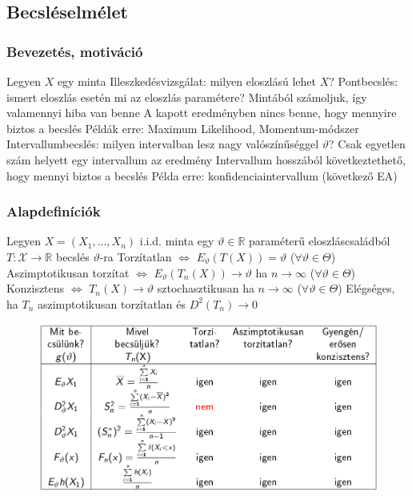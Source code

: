 \documentclass[12pt,a4paper]{article}
\begin{document}
\subsection{Becsléselmélet}

\subsubsection{Bevezetés, motiváció}

\begin{outline}
	\1 Legyen $X$ egy minta
	\1 Illeszkedésvizsgálat: milyen eloszlású lehet $X$?
	\1 Pontbecslés: ismert eloszlás esetén mi az eloszlás paramétere?
		\2 Mintából számoljuk, így valamennyi hiba van benne
		\2 A kapott eredményben nincs benne, hogy mennyire biztos a becslés
		\2 Példák erre: Maximum Likelihood, Momentum-módszer
	\1 Intervallumbecslés: milyen intervalban lesz nagy valószínűséggel $\vartheta$?
		\2 Csak egyetlen szám helyett egy intervallum az eredmény
		\2 Intervallum hosszából következtethető, hogy mennyi biztos a becslés
		\2 Példa erre: konfidenciaintervallum (következő EA)
\end{outline}

\pagebreak

\subsubsection{Alapdefiníciók}

\begin{outline}
	\1 Legyen $X = (X_1, ..., X_n)$ i.i.d. minta egy $\vartheta \in \mathbb{R}$ paraméterű eloszláscsaládból
	\1 $T : \mathcal{X} \to \mathbb{R}$ becslés $\vartheta$-ra
		\2 Torzítatlan $\Leftrightarrow$ $E_\vartheta(T(X)) = \vartheta$ \;\;\; ($\forall \vartheta \in \Theta$)
		\2 Aszimptotikusan torzítat $\Leftrightarrow$ $E_\vartheta(T_n(X)) \to \vartheta$ ha $n \to \infty$ ($\forall \vartheta \in \Theta$)
		\2 Konzisztens $\Leftrightarrow$ $T_n(X) \to \vartheta$ sztochasztikusan ha $n \to \infty$ ($\forall \vartheta \in \Theta$)
			\3 Elégséges, ha $T_n$ aszimptotikusan torzítatlan és $D^2(T_n) \to 0$
\end{outline}

\begin{figure}[h!]
	\centering
	\includegraphics[width=1\linewidth]{becslések}
\end{figure}
\end{document}
